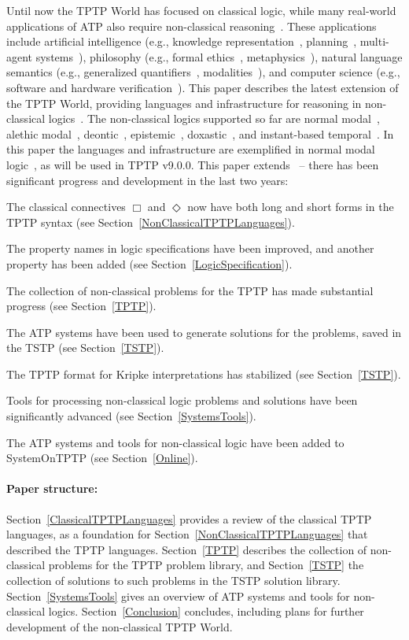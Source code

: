 \documentclass{ceurart}
\newenvironment{packed_itemize}{
\vspace*{-0.3em}
\begin{itemize}
\setlength{\partopsep}{0pt}
\setlength{\itemsep}{1pt}
\setlength{\parskip}{0pt}
\setlength{\parsep}{0pt}
}{\end{itemize}}
\begin{document}
Until now the TPTP World has focused on classical logic, while many real-world applications of 
ATP also require non-classical reasoning~\cite{SB24}.
These applications include artificial intelligence (e.g., knowledge representation~\cite{GG+11}, 
planning~\cite{LAR20}, multi-agent systems~\cite{CLS23}), philosophy (e.g., 
formal ethics~\cite{BPT20}, metaphysics~\cite{BW16}), natural language semantics (e.g., 
generalized quantifiers~\cite{vBe87}, modalities~\cite{Kra77}), and computer science (e.g., 
software and hardware verification~\cite{Bry91}).
This paper describes the latest extension of the TPTP World, providing languages and
infrastructure for reasoning in non-classical logics~\cite{Pri08,Gob01}.
The non-classical logics supported so far are
normal modal~\cite{FM98},
alethic modal~\cite{Sch06-CPL},
deontic~\cite{Hil71},
epistemic~\cite{vDH15},
doxastic~\cite{Hin62}, and
instant-based temporal~\cite{GR22}.
In this paper the languages and infrastructure are exemplified in normal modal logic~\cite{BBW06},
as will be used in TPTP v9.0.0.
This paper extends~\cite{SF+22} -- there has been significant progress and development in the 
last two years:
\begin{packed_itemize}
\item The classical connectives $\Box$ and $\Diamond$ now have both long and short forms in the
      TPTP syntax (see Section~\ref{NonClassicalTPTPLanguages}).
\item The property names in logic specifications have been improved, and another property
      has been added (see Section~\ref{LogicSpecification}).
\item The collection of non-classical problems for the TPTP has made substantial progress
      (see Section~\ref{TPTP}).
\item The ATP systems have been used to generate solutions for the problems, saved in the
      TSTP (see Section~\ref{TSTP}).
\item The TPTP format for Kripke interpretations has stabilized (see Section~\ref{TSTP}).
\item Tools for processing non-classical logic problems and solutions have been significantly
      advanced (see Section~\ref{SystemsTools}).
\item The ATP systems and tools for non-classical logic have been added to SystemOnTPTP 
      (see Section~\ref{Online}).
\end{packed_itemize}

\paragraph{Paper structure:}
Section~\ref{ClassicalTPTPLanguages} provides a review of the classical TPTP languages, as a 
foundation for
Section~\ref{NonClassicalTPTPLanguages} that described the TPTP languages.
Section~\ref{TPTP} describes the collection of non-classical problems for the TPTP problem library, 
and Section~\ref{TSTP} the collection of solutions to such problems in the TSTP solution library.
Section~\ref{SystemsTools} gives an overview of ATP systems and tools for non-classical logics.
Section~\ref{Conclusion} concludes, including plans for further development of the non-classical
TPTP World.
\end{document}
